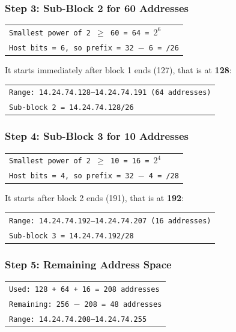 \documentclass[11pt,a4paper]{article}
\begin{document}
\subsubsection*{Step 3: Sub-Block 2 for 60 Addresses}

\begin{tabularx}{\textwidth}{@{}X@{}}
\texttt{Smallest power of 2 $\ge$ 60 = 64 = $2^{6}$} \\
\texttt{Host bits = 6, so prefix = 32 $-$ 6 = /26} \\
\end{tabularx}

It starts immediately after block 1 ends (127), that is at \textbf{128}:

\begin{tabularx}{\textwidth}{@{}X@{}}
\texttt{Range: 14.24.74.128--14.24.74.191 (64 addresses)} \\
\texttt{Sub-block 2 = 14.24.74.128/26} \\
\end{tabularx}

\subsubsection*{Step 4: Sub-Block 3 for 10 Addresses}

\begin{tabularx}{\textwidth}{@{}X@{}}
\texttt{Smallest power of 2 $\ge$ 10 = 16 = $2^{4}$} \\
\texttt{Host bits = 4, so prefix = 32 $-$ 4 = /28} \\
\end{tabularx}

It starts after block 2 ends (191), that is at \textbf{192}:

\begin{tabularx}{\textwidth}{@{}X@{}}
\texttt{Range: 14.24.74.192--14.24.74.207 (16 addresses)} \\
\texttt{Sub-block 3 = 14.24.74.192/28} \\
\end{tabularx}

\subsubsection*{Step 5: Remaining Address Space}

\begin{tabularx}{\textwidth}{@{}X@{}}
\texttt{Used: 128 + 64 + 16 = 208 addresses} \\
\texttt{Remaining: 256 $-$ 208 = 48 addresses} \\
\texttt{Range: 14.24.74.208--14.24.74.255} \\
\end{tabularx}
\end{document}
